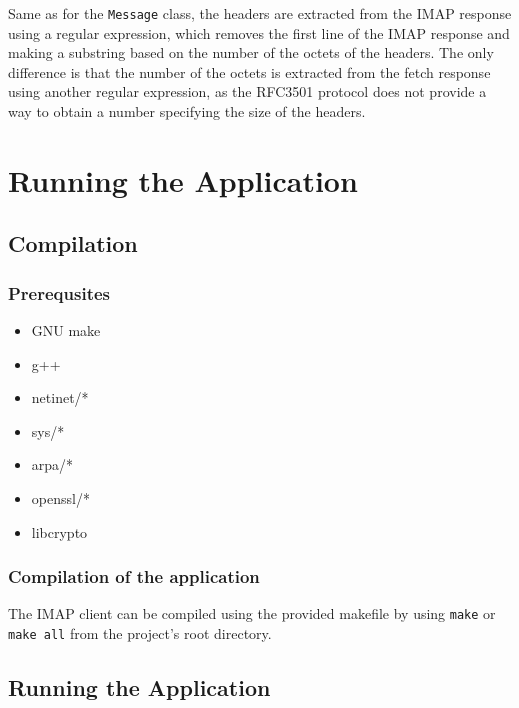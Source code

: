 \documentclass[11pt, a4paper]{article}
\begin{document}
Same as for the \verb|Message| class, the headers are extracted from the IMAP response using a regular expression, which removes the first line of the IMAP response and making a substring based on the number of the octets of the headers. The only difference is that the number of the octets is extracted from the fetch response using another regular expression, as the RFC3501 protocol does not provide a way to obtain a number specifying the size of the headers.

\section{Running the Application}
\subsection{Compilation}
\subsubsection{Prerequsites}

\begin{itemize}
  \item GNU make
  \item g++
  \item netinet/*
  \item sys/*
  \item arpa/*
  \item openssl/*
  \item libcrypto
\end{itemize}

\subsubsection{Compilation of the application}

The IMAP client can be compiled using the provided makefile by using \verb|make| or \verb|make all| from the project's root directory.
\subsection{Running the Application}
\end{document}
